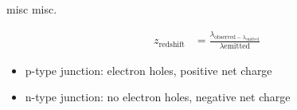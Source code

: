 \documentclass[avery5388, frame]{flashcards}
\begin{document}
\begin{flashcard}{misc misc.}
  {
    \begin{align*}
      z_{\textrm{redshift}} &= \frac{\lambda_{\textrm{observed} - \lambda_{\textrm{emitted}}}}{\lambda{\textrm{emitted}}}
    \end{align*}
    
    \begin{itemize}
    \item p-type junction: electron holes, positive net charge
    \item n-type junction: no electron holes, negative net charge
    \end{itemize}
  }
\end{flashcard}
\end{document}

